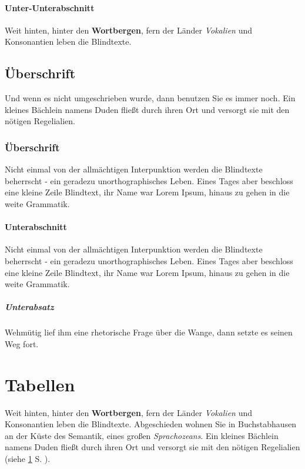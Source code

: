 \documentclass[%
	12pt,%
	a4paper,%
	oneside,%
	liststotoc, idxtotoc, bibtotoc, %
	parskip=half,%
	nochapterprefix,%
	appendixprefix, %
	headings=small,%
]{scrreprt}
\begin{document}
\subsubsection*{Unter-Unterabschnitt}
Weit hinten, hinter den \textbf{Wortbergen}, fern der Länder \textit{Vokalien} und Konsonantien leben die Blindtexte.

\section*{Überschrift}
Und wenn es nicht umgeschrieben wurde, dann benutzen Sie es immer noch. Ein kleines Bächlein namens Duden fließt durch ihren Ort und versorgt sie mit den nötigen Regelialien. %

\subsection*{Überschrift}
Nicht einmal von der allmächtigen Interpunktion werden die Blindtexte beherrscht - ein geradezu unorthographisches Leben. Eines Tages aber beschloss eine kleine Zeile Blindtext, ihr Name war Lorem Ipsum, hinaus zu gehen in die weite Grammatik.

\subsubsection*{Unterabschnitt}
Nicht einmal von der allmächtigen Interpunktion werden die Blindtexte beherrscht - ein geradezu unorthographisches Leben. Eines Tages aber beschloss eine kleine Zeile Blindtext, ihr Name war Lorem Ipsum, hinaus zu gehen in die weite Grammatik.

\paragraph*{Unterabsatz}
Wehmütig lief ihm eine rhetorische Frage über die Wange, dann setzte es seinen Weg fort.

\chapter{Tabellen}
\label{sec:Tabellen}

Weit hinten, hinter den \textbf{Wortbergen}, fern der Länder \textit{Vokalien} und Konsonantien leben die Blindtexte. Abgeschieden wohnen Sie in Buchstabhausen an der Küste%
 des Semantik, eines großen \textsl{Sprachozeans}. Ein kleines Bächlein namens Duden fließt durch ihren Ort und versorgt sie mit den nötigen Regelialien (siehe \ref{sec:Tabellen} S. \pageref{sec:Tabellen}).
\end{document}
